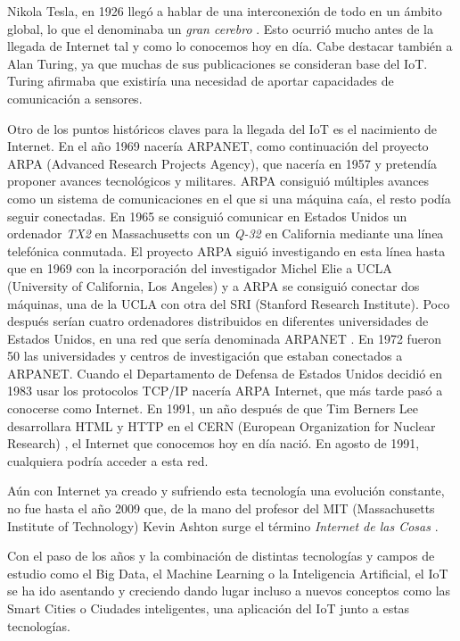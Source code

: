\documentclass[a4paper, 12pt, oneside]{book}
\begin{document}
Nikola Tesla, en 1926 llegó a hablar de una interconexión de todo en un ámbito global, lo que el denominaba un \textit{gran cerebro} \cite{gran_cerebro_tesla}. Esto ocurrió mucho antes de la llegada de Internet tal y como lo conocemos hoy en día. Cabe destacar también a Alan Turing, ya que muchas de sus publicaciones se consideran base del IoT.  Turing afirmaba que existiría una necesidad de aportar capacidades de comunicación a sensores\cite{alan_turing_iot}.

Otro de los puntos históricos claves para la llegada del IoT es el nacimiento de Internet. En el año 1969 nacería ARPANET, como continuación del proyecto ARPA (Advanced Research Projects Agency), que nacería en 1957 y  pretendía proponer avances tecnológicos y militares. ARPA consiguió múltiples avances como un sistema de comunicaciones en el que si una máquina caía, el resto podía seguir conectadas. 
En 1965 se consiguió comunicar en Estados Unidos un ordenador \textit{TX2} en Massachusetts con un \textit{Q-32} en California mediante una línea telefónica conmutada.
El proyecto ARPA siguió investigando en esta línea hasta que en 1969 con la incorporación del investigador Michel Elie a UCLA (University of California, Los Angeles) y a ARPA se consiguió conectar dos máquinas, una de la UCLA con otra del SRI (Stanford Research Institute). Poco después serían cuatro ordenadores distribuidos en diferentes universidades de Estados Unidos, en una red que sería denominada ARPANET \cite{arpa_arpanet}.
En 1972 fueron 50 las universidades y centros de investigación que estaban conectados a ARPANET.
Cuando el Departamento de Defensa de Estados Unidos decidió en 1983 usar los protocolos TCP/IP nacería ARPA Internet, que más tarde pasó a conocerse como Internet. En 1991, un año después de que Tim Berners Lee desarrollara HTML y HTTP en el CERN (European Organization for Nuclear Research) \cite{Tim_Berners_Lee}, el Internet que conocemos hoy en día nació. En agosto de 1991, cualquiera podría acceder a esta red.

Aún con Internet ya creado y sufriendo esta tecnología una evolución constante, no fue hasta el año 2009 que, de la mano del profesor del MIT (Massachusetts Institute of Technology) Kevin Ashton surge el término \textit{Internet de las Cosas} \cite{Kevin_Ashton}.

Con el paso de los años y la combinación de distintas tecnologías y campos de estudio como el Big Data, el Machine Learning o la Inteligencia Artificial, el IoT se ha ido asentando y creciendo dando lugar incluso a nuevos conceptos como las Smart Cities o Ciudades inteligentes, una aplicación del IoT junto a estas tecnologías.
\end{document}

